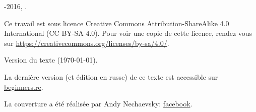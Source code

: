 ﻿\begin{titlepage}


\end{titlepage}

\newpage

\begin{center}
\vspace*{\fill}
{\LARGE \TITLE}

\vspace*{\fill}

{\large \AUTHOR}

{\large \TT{<\EMAIL>}}
\vspace*{\fill}
\vfill

\ccbysa

-2016, \AUTHOR. 

Ce travail est sous licence Creative Commons Attribution-ShareAlike 4.0 International (CC BY-SA 4.0).
Pour voir une copie de cette licence, rendez vous sur \url{https://creativecommons.org/licenses/by-sa/4.0/}.

Version du texte ({\large \today}).

La dernière version (et édition en russe) de ce texte est accessible sur \href{http://go.yurichev.com/17009}{beginners.re}.

La couverture a été réalisée par Andy Nechaevsky: \href{http://go.yurichev.com/17023}{facebook}.

\end{center}
